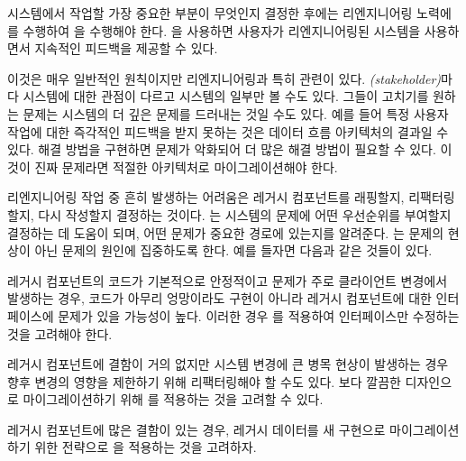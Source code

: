 \documentclass[a4paper,10pt,twoside]{book}
\begin{document}
시스템에서 작업할 가장 중요한 부분이 무엇인지 결정한 후에는 리엔지니어링 노력에 를 수행하여 을 수행해야 한다. 을 사용하면 사용자가 리엔지니어링된 시스템을 사용하면서 지속적인 피드백을 제공할 수 있다.




\discussion
이것은 매우 일반적인 원칙이지만 리엔지니어링과 특히 관련이 있다. \emph{(stakeholder)}마다 시스템에 대한 관점이 다르고 시스템의 일부만 볼 수도 있다. 그들이 고치기를 원하는 문제는 시스템의 더 깊은 문제를 드러내는 것일 수도 있다. 예를 들어 특정 사용자 작업에 대한 즉각적인 피드백을 받지 못하는 것은 데이터 흐름 아키텍처의 결과일 수 있다. 해결 방법을 구현하면 문제가 악화되어 더 많은 해결 방법이 필요할 수 있다. 이것이 진짜 문제라면 적절한 아키텍처로 마이그레이션해야 한다.

리엔지니어링 작업 중 흔히 발생하는 어려움은 레거시 컴포넌트를 래핑할지, 리팩터링할지, 다시 작성할지 결정하는 것이다. 는 시스템의 문제에 어떤 우선순위를 부여할지 결정하는 데 도움이 되며, 어떤 문제가 중요한 경로에 있는지를 알려준다. 는 문제의 현상이 아닌 문제의 원인에 집중하도록 한다. 예를 들자면 다음과 같은 것들이 있다.

\begin{bulletlist}
  \item 레거시 컴포넌트의 코드가 기본적으로 안정적이고 문제가 주로 클라이언트 변경에서 발생하는 경우, 코드가 아무리 엉망이라도 구현이 아니라 레거시 컴포넌트에 대한 인터페이스에 문제가 있을 가능성이 높다. 이러한 경우 를 적용하여 인터페이스만 수정하는 것을 고려해야 한다.

  \item 레거시 컴포넌트에 결함이 거의 없지만 시스템 변경에 큰 병목 현상이 발생하는 경우 향후 변경의 영향을 제한하기 위해 리팩터링해야 할 수도 있다. 보다 깔끔한 디자인으로 마이그레이션하기 위해 를 적용하는 것을 고려할 수 있다.

  \item 레거시 컴포넌트에 많은 결함이 있는 경우, 레거시 데이터를 새 구현으로 마이그레이션하기 위한 전략으로 을 적용하는 것을 고려하자.
\end{bulletlist}
\end{document}
